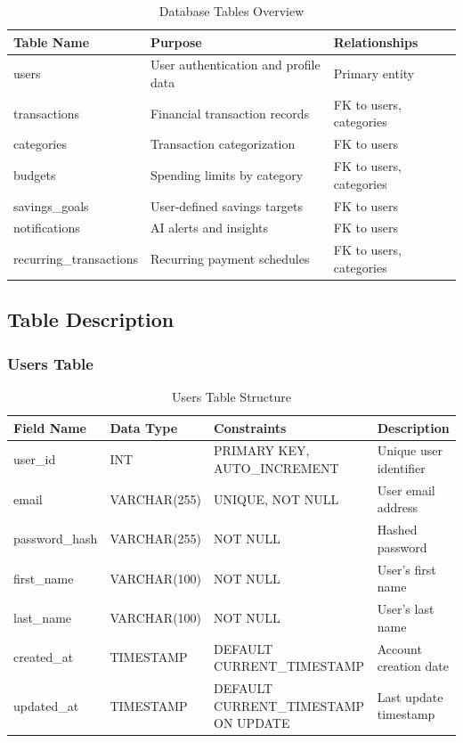 \documentclass[12pt,a4paper]{article}
\begin{document}
\begin{table}[H]
    \centering
    \caption{Database Tables Overview}
    \label{tab:db_tables}
    \begin{tabular}{@{}lll@{}}
        \toprule
        \textbf{Table Name} & \textbf{Purpose} & \textbf{Relationships} \\
        \midrule
        users & User authentication and profile data & Primary entity \\
        transactions & Financial transaction records & FK to users, categories \\
        categories & Transaction categorization & FK to users \\
        budgets & Spending limits by category & FK to users, categories \\
        savings\_goals & User-defined savings targets & FK to users \\
        notifications & AI alerts and insights & FK to users \\
        recurring\_transactions & Recurring payment schedules & FK to users, categories \\
        \bottomrule
    \end{tabular}
\end{table}

\subsection{Table Description}

\subsubsection{Users Table}
\begin{table}[H]
    \centering
    \caption{Users Table Structure}
    \label{tab:users_table}
    \begin{tabular}{@{}llll@{}}
        \toprule
        \textbf{Field Name} & \textbf{Data Type} & \textbf{Constraints} & \textbf{Description} \\
        \midrule
        user\_id & INT & PRIMARY KEY, AUTO\_INCREMENT & Unique user identifier \\
        email & VARCHAR(255) & UNIQUE, NOT NULL & User email address \\
        password\_hash & VARCHAR(255) & NOT NULL & Hashed password \\
        first\_name & VARCHAR(100) & NOT NULL & User's first name \\
        last\_name & VARCHAR(100) & NOT NULL & User's last name \\
        created\_at & TIMESTAMP & DEFAULT CURRENT\_TIMESTAMP & Account creation date \\
        updated\_at & TIMESTAMP & DEFAULT CURRENT\_TIMESTAMP ON UPDATE & Last update timestamp \\
        \bottomrule
    \end{tabular}
\end{table}
\end{document}
